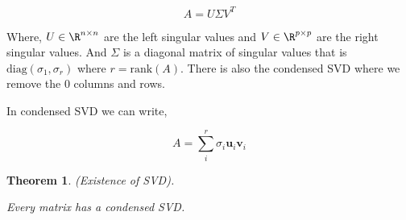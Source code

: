 \documentclass[twoside]{article}
\newcommand\rank[1]{\text{rank}(#1)}
\newtheorem{theorem}{Theorem}[section]
\begin{document}
\begin{equation}
A = U \Sigma V^T
\end{equation}

Where, $U \in \R^{n\times n}$ are the left singular values and $V\in\R^{p \times p}$ are the right singular values. And $\Sigma$ is a diagonal matrix of singular values that is $\text{diag}(\sigma_1,\sigma_r)$ where $r = \rank{A}$. There is also the condensed SVD where we remove the 0 columns and rows.

In condensed SVD we can write,

$$A = \sum_i^r\sigma_{i}\textbf{u}_{i}\textbf{v}_{i}$$ 

\begin{theorem}{(Existence of SVD).}

Every matrix has a condensed SVD.
\end{theorem}
\end{document}
